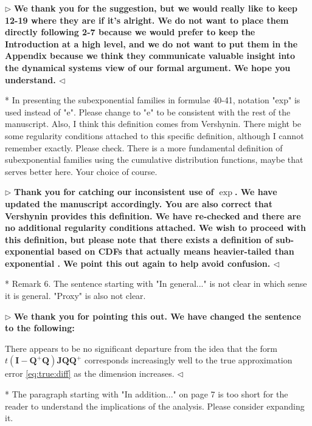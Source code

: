 \documentclass[12pt]{article}
\newenvironment{reply}{$\triangleright$\bfseries}{$\triangleleft$}
\renewenvironment{quote}
               {\list{}{\rightmargin\leftmargin}%
                \item\relax\normalfont}
               {\endlist}
\newcommand{\QQ}{\mathbf{Q}}
\newcommand{\JJ}{\mathbf{J}}
\newcommand{\II}{\mathbf{I}}
\begin{document}
\begin{reply}
We thank you for the suggestion, but we would really like to keep 12-19 where they are if it's alright.  We do not want to place them directly following 2-7 because we would prefer to keep the Introduction at a high level, and we do not want to put them in the Appendix because we think they communicate valuable insight into the dynamical systems view of our formal argument.  We hope you understand.
\end{reply}

* In presenting the subexponential families in formulae 40-41, notation "exp" is used instead of "e". Please change to "e" to be consistent with the rest of the manuscript. Also, I think this definition comes from Vershynin. There might be some regularity conditions attached to this specific definition, although I cannot remember exactly. Please check. There is a more fundamental definition of subexponential families using the cumulative distribution functions, maybe that serves better here. Your choice of course. 

\begin{reply}
	Thank you for catching our inconsistent use of $\exp$.  We have updated the manuscript accordingly.  You are also correct that Vershynin provides this definition.  We have re-checked and there are no additional regularity conditions attached.   We wish to proceed with this definition, but please note that there exists a definition of sub-exponential based on CDFs that actually means heavier-tailed than exponential \citep{goldie1998subexponential}.  We point this out again to help avoid confusion.
\end{reply}

* Remark 6. The sentence starting with "In general..." is not clear in which sense it is general. "Proxy" is also not clear. 

\begin{reply}
	We thank you for pointing this out. We have changed the sentence to the following:
	\begin{quote}
		There appears to be no
		significant departure from the idea that the form
		$t(\II -\QQ^+ \QQ) \JJ \QQ \QQ^{+}$ corresponds increasingly well to
		the true approximation error \eqref{eq:true:diff} as the dimension
		increases.
	\end{quote}
\end{reply}

* The paragraph starting with "In addition..." on page 7 is too short for the reader to understand the implications of the analysis. Please consider expanding it. 
\end{document}
